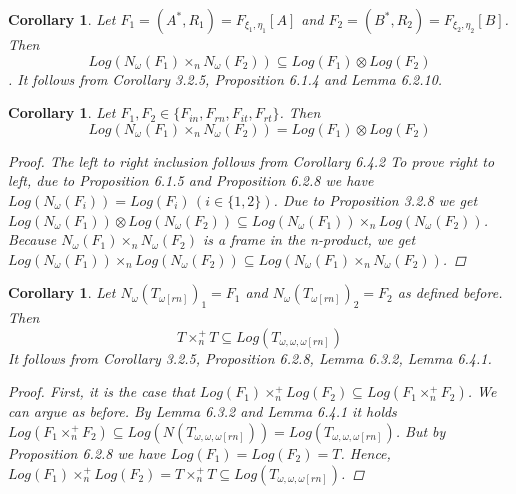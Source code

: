\documentclass[12pt, a4paper]{scrartcl}
\newtheorem{corollary}[definition]{Corollary}
\begin{document}
    \begin{corollary}
        Let $F_1 = (A^*,R_1) = F_{\xi_1, \eta_1}[A]$ and $F_2 = (B^*,R_2) = F_{\xi_2, \eta_2}[B]$. Then 
        $$Log(N_\omega(F_1) \times_n N_\omega(F_2))  \subseteq Log(F_1) \otimes Log(F_2)$$.
        It follows from Corollary 3.2.5, Proposition 6.1.4 and Lemma 6.2.10.
    \end{corollary}

    \begin{corollary}
        Let $F_1, F_2 \in \{F_{in}, F_{rn}, F_{it}, F_{rt}\}$. Then 
        $$Log(N_\omega(F_1) \times_nN_\omega(F_2)) = Log(F_1) \otimes Log(F_2)$$

        \begin{proof}
            The left to right inclusion follows from Corollary 6.4.2 \newline \newline
            To prove right to left, due to Proposition 6.1.5 and Proposition 6.2.8 we have $Log(N_\omega(F_i)) = Log(F_i) \, (i \in \{1,2\})$.
            Due to Proposition 3.2.8 we get $Log(N_\omega(F_1)) \otimes Log(N_\omega(F_2)) \subseteq Log(N_\omega(F_1)) \times_n Log(N_\omega(F_2))$. 
            Because $N_\omega(F_1)\times_n N_\omega(F_2)$ is a frame in the n-product, we get
            $Log(N_\omega(F_1)) \times_n Log(N_\omega(F_2)) \subseteq Log(N_\omega(F_1)\times_n N_\omega(F_2))$.

        \end{proof}

    \end{corollary}

    \begin{corollary}
        Let $N_\omega(T_{\omega[rn]})_1 = F_1$ and $N_\omega(T_{\omega[rn]})_2 = F_2$ as defined before. Then 
        $$T \times^+_n T \subseteq Log(T_{\omega,\omega,\omega[rn]})$$
        It follows from Corollary 3.2.5, Proposition 6.2.8, Lemma 6.3.2, Lemma 6.4.1.

        \begin{proof}
            First, it is the case that $Log(F_1) \times^+_n Log(F_2) \subseteq Log(F_1 \times^+_n F_2)$. We can argue as before.
            By Lemma 6.3.2 and Lemma 6.4.1 it holds $Log(F_1 \times^+_n F_2) \subseteq Log(N(T_{\omega,\omega,\omega[rn]})) = Log(T_{\omega,\omega,\omega[rn]})$.
            But by Proposition 6.2.8 we have $Log(F_1) = Log(F_2) = T$. Hence, $Log(F_1) \times^+_n Log(F_2) = T \times^+_n T \subseteq Log(T_{\omega,\omega,\omega[rn]})$.
        \end{proof}

    \end{corollary}
\end{document}
